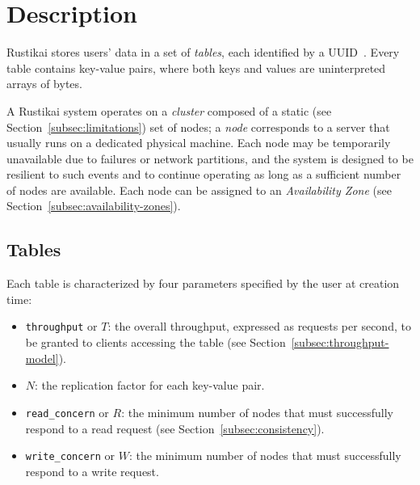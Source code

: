 \section{Description}
\label{sec:architecture}

Rustikai stores users' data in a set of \emph{tables}, each identified by a
UUID~\cite{rfc9562}.
Every table contains key-value pairs, where both keys and values are
uninterpreted arrays of bytes.

A Rustikai system operates on a \emph{cluster} composed of a static (see
Section~\ref{subsec:limitations}) set of nodes; a \emph{node} corresponds to a
server that usually runs on a dedicated physical machine.
Each node may be temporarily unavailable due to failures or network partitions,
and the system is designed to be resilient to such events and to continue operating
as long as a sufficient number of nodes are available.
Each node can be assigned to an \emph{Availability Zone} (see
Section~\ref{subsec:availability-zones}).

\subsection{Tables}
\label{subsec:tables}

Each table is characterized by four parameters specified by the user at creation time:
\begin{itemize}
    \item \texttt{throughput} or $T$: the overall throughput, expressed as requests per second, to be granted
        to clients accessing the table (see Section~\ref{subsec:throughput-model}).
    \item $N$: the replication factor for each key-value pair.
    \item \texttt{read\_concern} or $R$: the minimum number of nodes that must
        successfully respond to a read request (see Section~\ref{subsec:consistency}).
    \item \texttt{write\_concern} or $W$: the minimum number of nodes
        that must successfully respond to a write request.
\end{itemize}

